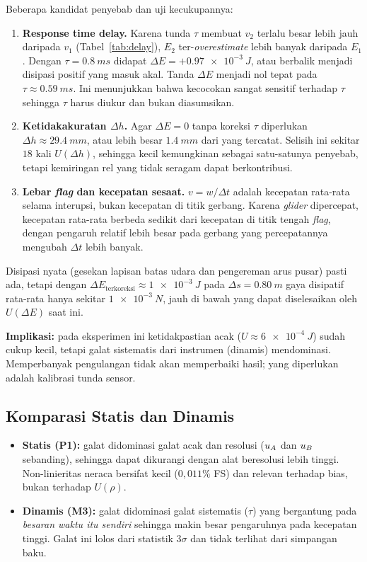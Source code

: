 \documentclass[a4paper, 12pt]{article}
\begin{document}
        Beberapa kandidat penyebab dan uji kecukupannya:
        \begin{enumerate}
            \item \textbf{Response time delay.} Karena tunda $\tau$ membuat $v_2$ terlalu besar lebih jauh daripada $v_1$ (Tabel~\ref{tab:delay}), $E_2$ ter-\textit{overestimate} lebih banyak daripada $E_1$. Dengan $\tau=\SI{0,8}{ms}$ didapat $\Delta E=+\SI{0,97e-3}{J}$, atau berbalik menjadi disipasi positif yang masuk akal. Tanda $\Delta E$ menjadi nol tepat pada $\tau\approx\SI{0,59}{ms}$. Ini menunjukkan bahwa kecocokan sangat sensitif terhadap $\tau$ sehingga $\tau$ harus diukur dan bukan diasumsikan.
            \item \textbf{Ketidakakuratan $\Delta h$.} Agar $\Delta E=0$ tanpa koreksi $\tau$ diperlukan $\Delta h\approx\SI{29,4}{mm}$, atau lebih besar $\SI{1,4}{mm}$ dari yang tercatat. Selisih ini sekitar $18$ kali $U(\Delta h)$, sehingga kecil kemungkinan sebagai satu-satunya penyebab, tetapi kemiringan rel yang tidak seragam dapat berkontribusi.
            \item \textbf{Lebar \textit{flag} dan kecepatan sesaat.} $v=w/\Delta t$ adalah kecepatan rata-rata selama interupsi, bukan kecepatan di titik gerbang. Karena \textit{glider} dipercepat, kecepatan rata-rata berbeda sedikit dari kecepatan di titik tengah \textit{flag}, dengan pengaruh relatif lebih besar pada gerbang yang percepatannya mengubah $\Delta t$ lebih banyak.
        \end{enumerate}
        Disipasi nyata (gesekan lapisan batas udara dan pengereman arus pusar) pasti ada, tetapi dengan $\Delta E_{\text{terkoreksi}}\approx\SI{1e-3}{J}$ pada $\Delta s=\SI{0,80}{m}$ gaya disipatif rata-rata hanya sekitar $\SI{1e-3}{N}$, jauh di bawah yang dapat diselesaikan oleh $U(\Delta E)$ saat ini.

        \textbf{Implikasi:} pada eksperimen ini ketidakpastian acak ($U\approx\SI{6e-4}{J}$) sudah cukup kecil, tetapi galat sistematis dari instrumen (dinamis) mendominasi. Memperbanyak pengulangan tidak akan memperbaiki hasil; yang diperlukan adalah kalibrasi tunda sensor.

        \subsection{Komparasi Statis dan Dinamis}
        \begin{itemize}
            \item \textbf{Statis (P1):} galat didominasi galat acak dan resolusi ($u_{A}$ dan $u_{B}$ sebanding), sehingga dapat dikurangi dengan alat beresolusi lebih tinggi. Non-linieritas neraca bersifat kecil ($0{,}011\%$ FS) dan relevan terhadap bias, bukan terhadap $U(\rho)$.
            \item \textbf{Dinamis (M3):} galat didominasi galat sistematis ($\tau$) yang bergantung pada \textit{besaran waktu itu sendiri} sehingga makin besar pengaruhnya pada kecepatan tinggi. Galat ini lolos dari statistik $3\sigma$ dan tidak terlihat dari simpangan baku.
        \end{itemize}
\end{document}
